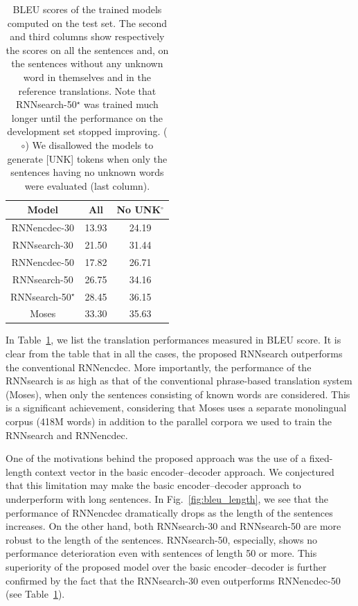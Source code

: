 \documentclass{article}
\begin{document}
\begin{table}[t]
    \centering
    \hfill
    \begin{minipage}{0.45\textwidth}
        \begin{tabular}{c|c|c}
        Model & All & No UNK$^\circ$ \\
        \hline
        \hline
        RNNencdec-30 & 13.93 & 24.19 \\
        RNNsearch-30 & 21.50 & 31.44 \\
        \hline
        RNNencdec-50 & 17.82 & 26.71 \\
        RNNsearch-50 & 26.75 & 34.16 \\
        \hline
        RNNsearch-50$^\star$ & 28.45 & 36.15 \\
        \hline
        Moses & 33.30 & 35.63
        \end{tabular}
    \end{minipage}
    \begin{minipage}[t!]{0.53\textwidth}
        \vspace{-2mm}

        \caption{BLEU scores of the trained models computed on the test set.
            The second and third columns show respectively the scores on all the
            sentences and, on the sentences without any unknown word in
            themselves and in the reference translations. Note that
            RNNsearch-50$^\star$ was trained much longer until the performance
            on the development set stopped improving.  ($\circ$) We disallowed
            the models to generate [UNK] tokens when only the sentences having
            no unknown words were evaluated (last column).  
        }
        \label{tab:bleu}
    \end{minipage}
    \hfill
\end{table}

In Table~\ref{tab:bleu}, we list the translation performances measured in BLEU
score. It is clear from the table that in all the cases, the proposed RNNsearch
outperforms the conventional RNNencdec.  More importantly, the performance of the
RNNsearch is as high as that of the conventional phrase-based translation system
(Moses), when only the sentences consisting of known words are considered. This
is a significant achievement, considering that Moses uses a separate monolingual
corpus (418M words) in addition to the parallel corpora we used to train the
RNNsearch and RNNencdec.

One of the motivations behind the proposed approach was the use of a
fixed-length context vector in the basic encoder--decoder approach. We
conjectured that this limitation may make the basic encoder--decoder approach to
underperform with long sentences. In Fig.~\ref{fig:bleu_length}, we see that the
performance of RNNencdec dramatically drops as the length of the sentences
increases. On the other hand, both RNNsearch-30 and RNNsearch-50 are more robust
to the length of the sentences. RNNsearch-50, especially, shows no performance
deterioration even with sentences of length 50 or more. This superiority of the
proposed model over the basic encoder--decoder is further confirmed by the fact
that the RNNsearch-30 even outperforms RNNencdec-50 (see Table~\ref{tab:bleu}).
\end{document}
